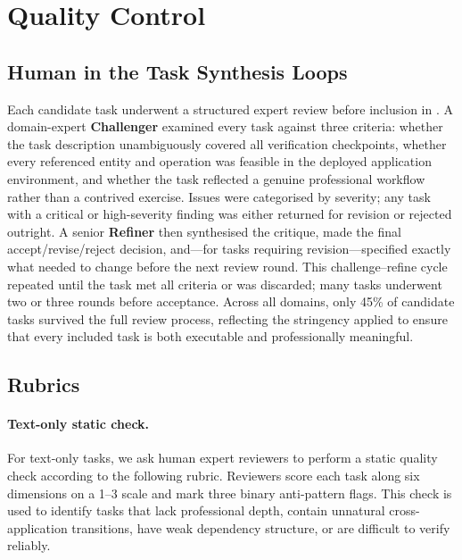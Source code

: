 \appendix

\section{Quality Control}
\label{app:qc}

\subsection{Human in the Task Synthesis Loops}
\label{app:qc-loop}

Each candidate task underwent a structured expert review before inclusion in
\datasetname. A domain-expert \textbf{Challenger} examined every task against
three criteria: whether the task description unambiguously covered all
verification checkpoints, whether every referenced entity and operation was
feasible in the deployed application environment, and whether the task
reflected a genuine professional workflow rather than a contrived exercise.
Issues were categorised by severity; any task with a critical or
high-severity finding was either returned for revision or rejected outright.
A senior \textbf{Refiner} then synthesised the critique, made the final
accept/revise/reject decision, and---for tasks requiring revision---specified
exactly what needed to change before the next review round. This
challenge--refine cycle repeated until the task met all criteria or was
discarded; many tasks underwent two or three rounds before acceptance.
Across all domains, only 45\% of candidate tasks survived the full review
process, reflecting the stringency applied to ensure that every included
task is both executable and professionally meaningful.

\subsection{Rubrics}
\label{app:qc-rubrics}

\paragraph{Text-only static check.}
For text-only tasks, we ask human expert reviewers to perform a static quality check according to the following rubric. Reviewers score each task along six dimensions on a 1--3 scale and mark three binary anti-pattern flags. This check is used to identify tasks that lack professional depth, contain unnatural cross-application transitions, have weak dependency structure, or are difficult to verify reliably.

